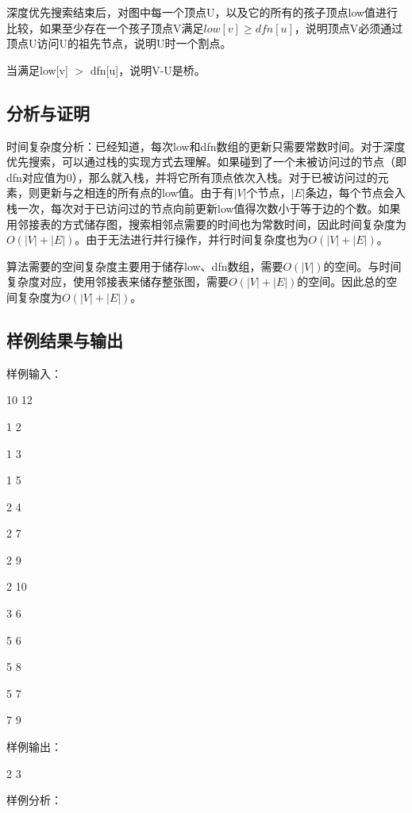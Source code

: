 \documentclass[UTF8,a4paperdui, %
]{ctexart}
\begin{document}
深度优先搜索结束后，对图中每一个顶点U，以及它的所有的孩子顶点low值进行比较，如果至少存在一个孩子顶点V满足$low[v]\geq dfn[u]$，说明顶点V必须通过顶点U访问U的祖先节点，说明U时一个割点。

当满足low[v] $>$ dfn[u]，说明V-U是桥。

\subsection{分析与证明}
时间复杂度分析：已经知道，每次low和dfn数组的更新只需要常数时间。对于深度优先搜索，可以通过栈的实现方式去理解。如果碰到了一个未被访问过的节点（即dfn对应值为0），那么就入栈，并将它所有顶点依次入栈。对于已被访问过的元素，则更新与之相连的所有点的low值。由于有$|V|$个节点，$|E|$条边，每个节点会入栈一次，每次对于已访问过的节点向前更新low值得次数小于等于边的个数。如果用邻接表的方式储存图，搜索相邻点需要的时间也为常数时间，因此时间复杂度为$O(|V|+|E|)$。由于无法进行并行操作，并行时间复杂度也为$O(|V|+|E|)$。

算法需要的空间复杂度主要用于储存low、dfn数组，需要$O(|V|)$的空间。与时间复杂度对应，使用邻接表来储存整张图，需要$O(|V|+|E|)$的空间。因此总的空间复杂度为$O(|V|+|E|)$。
\subsection{样例结果与输出}
样例输入：

10 12 

1 2 

1 3 

1 5 

2 4 

2 7 

2 9 

2 10 

3 6 

5 6 

5 8 

5 7 

7 9

样例输出：

2 3 

样例分析：
\end{document}
